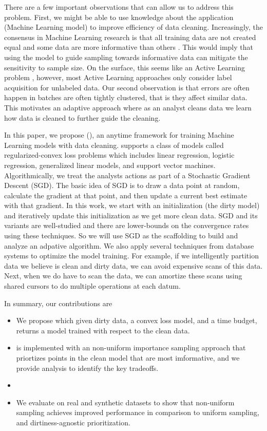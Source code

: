 There are a few important observations that can allow us to address this problem.
First, we might be able to use knowledge about the application (Machine Learning model) to improve efficiency of data cleaning.
Increasingly, the consensus in Machine Learning research is that all training data are not created equal and some data are more informative than others \cite{drineas2012fast, settles2010active}.
This would imply that using the model to guide sampling towards informative data can mitigate the sensitivity to sample size.
On the surface, this seems like an Active Learning problem \cite{settles2010active}, however, most Active Learning approaches only consider label acquisition for unlabeled data. 
Our second observation is that errors are often happen in batches are often tightly clustered, that is they affect similar data.
This motivates an adaptive approach where as an analyst cleans data we learn how data is cleaned to further guide the cleaning.

In this paper, we propose \sysfull (\sys), an anytime framework for training Machine Learning models with data cleaning.
\sys supports a class of models called regularized-convex loss problems which includes linear regression, logistic regression, generalized linear models, and support vector machines.
Algorithmically, we treat the analysts actions as part of a Stochastic Gradient Descent (SGD).
The basic idea of SGD is to draw a data point at random, calculate the gradient at that point, and then update a current best estimate with that gradient.
In this work, we start with an initialization (the dirty model) and iteratively update this initialization as we get more clean data. 
SGD and its variants are well-studied and there are lower-bounds on the convergence rates using these techniques. So we will use SGD as the scaffolding to build and analyze an adpative algorithm. 
We also apply several techniques from database systems to optimize the model training.
For example, if we intelligently partition data we believe is clean and dirty data, we 
can avoid expensive scans of this data.
Next, when we do have to scan the data, we can amortize these scans using shared cursors to do multiple operations at each datum.

In summary, our contributions are
\begin{itemize}[noitemsep]
\item We propose \sysfull which given dirty data, a convex loss model, and a time budget, returns a model trained with respect to the clean data.
\item \sysfull is implemented with an non-uniform importance sampling approach that priortizes points in the clean model that are most imformative, and we provide analysis to identify the key tradeoffs.
\item {}
\item We evaluate \sysfull on real and synthetic datasets to show that non-uniform sampling achieves improved performance in comparison to uniform sampling, and dirtiness-agnostic prioritization.
\end{itemize}








